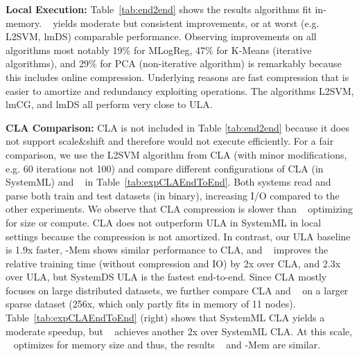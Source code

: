\textbf{Local Execution:}
Table~\ref{tab:end2end} shows the results algorithms fit in-memory.
\name~ yields moderate but consistent improvements, or at worst (e.g. L2SVM, lmDS) comparable performance.
Observing improvements on all algorithms most notably 19\% for MLogReg, 47\% for K-Means (iterative algorithms), and 29\% for PCA (non-iterative algorithm) is remarkably because this includes online compression.
Underlying reasons are fast compression that is easier to amortize and redundancy exploiting operations.
The algorithms L2SVM, lmCG, and lmDS all perform very close to ULA.

\textbf{CLA Comparison:} CLA is not included in Table \ref{tab:end2end} because it does not support scale\&shift and therefore would not execute efficiently.
For a fair comparison, we use the L2SVM algorithm from CLA \cite{ElgoharyBHRR18} (with minor modifications, e.g. 60 iterations not 100) and compare different configurations of CLA (in SystemML) and \name~ in Table~\ref{tab:expCLAEndToEnd}.
Both systems read and parse both train and test datasets (in binary), increasing I/O compared to the other experiments.
We observe that CLA compression is slower than \name~ optimizing for size or compute.
CLA does not outperform ULA in SystemML in local settings because the compression is not amortized.
In contrast, our ULA baseline is 1.9x faster, \name-Mem shows similar performance to CLA, and \name~ improves the relative training time (without compression and IO) by 2x over CLA, and 2.3x over ULA, but SystemDS ULA is the fastest end-to-end. 
Since CLA mostly focuses on large distributed datasets, we further compare CLA and \name~ on a larger sparse dataset (256x, which only partly fits in memory of 11 nodes). Table~\ref{tab:expCLAEndToEnd} (right) shows that SystemML CLA yields a moderate speedup, but \name~ achieves another 2x over SystemML CLA.
At this scale, \name~ optimizes for memory size and thus, the results \name~ and \name-Mem are similar.

\newcommand{\headendtoendtwo}{
	& \multicolumn{2}{c|}{\textbf{lmCG}}
	& \multicolumn{2}{c|}{\textbf{lmDS}}
	& \multicolumn{2}{c}{\textbf{L2SVM}} \\}


\newcommand{\headendtoendone}{
	& \multicolumn{2}{c|}{\textbf{K-Means}}
	& \multicolumn{2}{c|}{\textbf{PCA}}
	& \multicolumn{2}{c}{\textbf{MLogReg}} \\}

